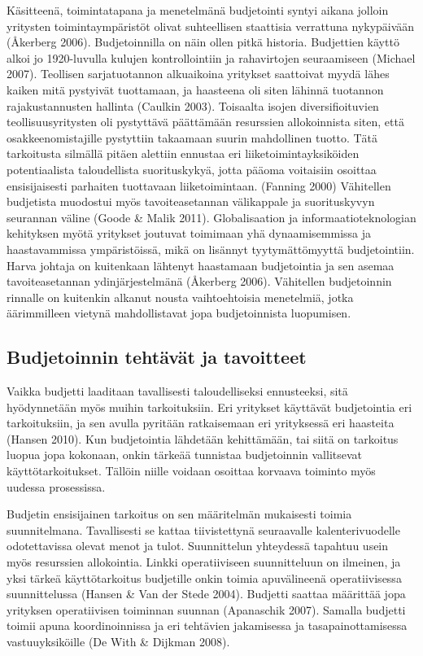 \documentclass[12pt,a4paper,oneside,pdftex]{report}
\begin{document}
Käsitteenä, toimintatapana ja menetelmänä budjetointi syntyi aikana jolloin yritysten toimintaympäristöt olivat suhteellisen staattisia verrattuna nykypäivään (Åkerberg 2006). Budjetoinnilla on näin ollen pitkä historia. Budjettien käyttö alkoi jo 1920-luvulla kulujen kontrollointiin ja rahavirtojen seuraamiseen (Michael 2007). Teollisen sarjatuotannon alkuaikoina yritykset saattoivat myydä lähes kaiken mitä pystyivät tuottamaan, ja haasteena oli siten lähinnä tuotannon rajakustannusten hallinta (Caulkin 2003). Toisaalta isojen diversifioituvien teollisuusyritysten oli pystyttävä päättämään resurssien allokoinnista siten, että osakkeenomistajille pystyttiin takaamaan suurin mahdollinen tuotto. Tätä tarkoitusta silmällä pitäen alettiin ennustaa eri liiketoimintayksiköiden potentiaalista taloudellista suorituskykyä, jotta pääoma voitaisiin osoittaa ensisijaisesti parhaiten tuottavaan liiketoimintaan. (Fanning 2000) Vähitellen budjetista muodostui myös tavoiteasetannan välikappale ja suorituskyvyn seurannan väline (Goode & Malik 2011). Globalisaation ja informaatioteknologian kehityksen myötä yritykset joutuvat toimimaan yhä dynaamisemmissa ja haastavammissa ympäristöissä, mikä on lisännyt tyytymättömyyttä budjetointiin. Harva johtaja on kuitenkaan lähtenyt haastamaan budjetointia ja sen asemaa tavoiteasetannan ydinjärjestelmänä (Åkerberg 2006). Vähitellen budjetoinnin rinnalle on kuitenkin alkanut nousta vaihtoehtoisia menetelmiä, jotka äärimmilleen vietynä mahdollistavat jopa budjetoinnista luopumisen.

\subsection{Budjetoinnin tehtävät ja tavoitteet}

Vaikka budjetti laaditaan tavallisesti taloudelliseksi ennusteeksi, sitä hyödynnetään myös muihin tarkoituksiin. Eri yritykset käyttävät budjetointia eri tarkoituksiin, ja sen avulla pyritään ratkaisemaan eri yrityksessä eri haasteita (Hansen 2010). Kun budjetointia lähdetään kehittämään, tai siitä on tarkoitus luopua jopa kokonaan, onkin tärkeää tunnistaa budjetoinnin vallitsevat käyttötarkoitukset. Tällöin niille voidaan osoittaa korvaava toiminto myös uudessa prosessissa.

Budjetin ensisijainen tarkoitus on sen määritelmän mukaisesti toimia suunnitelmana. Tavallisesti se kattaa tiivistettynä seuraavalle kalenterivuodelle odotettavissa olevat menot ja tulot. Suunnittelun yhteydessä tapahtuu usein myös resurssien allokointia. Linkki operatiiviseen suunnitteluun on ilmeinen, ja yksi tärkeä käyttötarkoitus budjetille onkin toimia apuvälineenä operatiivisessa suunnittelussa (Hansen & Van der Stede 2004). Budjetti saattaa määrittää jopa yrityksen operatiivisen toiminnan suunnan (Apanaschik 2007). Samalla budjetti toimii apuna koordinoinnissa ja eri tehtävien jakamisessa ja tasapainottamisessa vastuuyksiköille (De With & Dijkman 2008).
\end{document}
